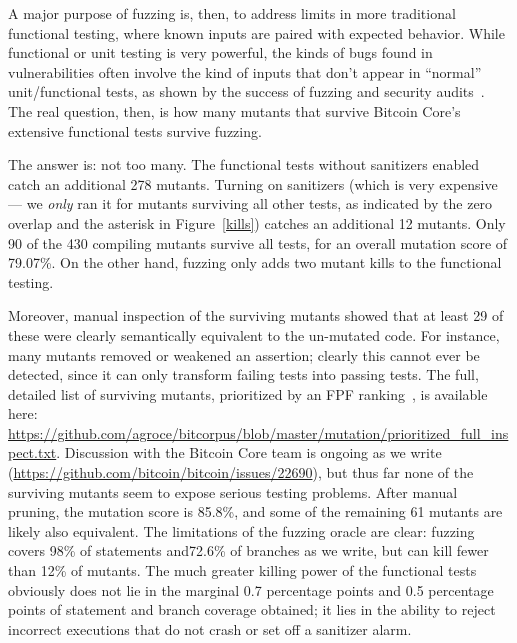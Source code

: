 A major purpose of fuzzing is, then, to address limits in more
traditional functional testing, where known inputs are paired with
expected behavior.  While functional or unit testing is very powerful,
the kinds of bugs found in vulnerabilities often involve the kind of
inputs that don't appear in ``normal'' unit/functional tests, as shown
by the success of fuzzing and security audits~\cite{FC20}.  The real
question, then, is how many mutants that survive Bitcoin Core's
extensive functional tests survive fuzzing.

The answer is: not too many.  The functional tests without sanitizers
enabled catch an additional 278 mutants.  Turning on sanitizers (which
is very expensive --- we \emph{only} ran it for mutants surviving all other
tests, as indicated by the zero overlap and the asterisk in Figure~\ref{kills}) catches an additional 12 mutants.  Only 90 of the
430 compiling mutants survive all tests, for an overall mutation score
of 79.07\%.  On the other hand, fuzzing only adds two mutant kills to
the functional testing.

Moreover, manual inspection of the surviving mutants showed that at
least 29 of these were clearly semantically equivalent to the
un-mutated code.  For instance, many mutants removed or weakened an
assertion; clearly this cannot ever be detected, since it can only
transform failing tests into passing tests.  The full, detailed list
of surviving mutants, prioritized by an FPF ranking~\cite{10.1145/2491956.2462173,Gonzalez85}, is
available here:
\url{https://github.com/agroce/bitcorpus/blob/master/mutation/prioritized_full_inspect.txt}.
Discussion with the Bitcoin Core team is ongoing as we write
(\url{https://github.com/bitcoin/bitcoin/issues/22690}), but thus far
none of the surviving mutants seem to expose serious testing
problems.  After manual pruning, the mutation score is 85.8\%, and
some of the remaining 61 mutants are likely also equivalent.  The
limitations of the fuzzing oracle are clear: fuzzing covers 98\% of
statements and72.6\% of branches as we write, but can kill fewer than
12\% of mutants.  The much greater killing power of the functional
tests obviously does not lie in the marginal 0.7 percentage points and 0.5
percentage points of statement and branch coverage obtained; it lies
in the ability to reject incorrect executions that do not crash or set
off a sanitizer alarm.


